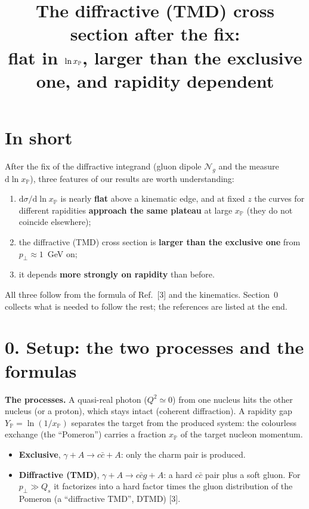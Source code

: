 \documentclass[12pt]{article}
\title{The diffractive (TMD) cross section after the fix:\\
flat in $\ln\xpo$, larger than the exclusive one, and rapidity dependent}
\author{}
\date{}
\newcommand{\xpo}{x_{\mathbb{P}}}
\begin{document}
\maketitle

\section*{In short}

After the fix of the diffractive integrand (gluon dipole $\mathcal{N}_g$ and the measure
$\mathrm{d}\ln\xpo$), three features of our results are worth understanding:
\begin{enumerate}
\item $\mathrm{d}\sigma/\mathrm{d}\ln\xpo$ is nearly \textbf{flat} above a kinematic edge, and at fixed
  $z$ the curves for different rapidities \textbf{approach the same plateau} at large $\xpo$ (they do
  not coincide elsewhere);
\item the diffractive (TMD) cross section is \textbf{larger than the exclusive one} from
  $p_\perp\approx1$~GeV on;
\item it depends \textbf{more strongly on rapidity} than before.
\end{enumerate}
All three follow from the formula of Ref.~[3] and the kinematics. Section~0 collects what is needed
to follow the rest; the references are listed at the end.

\section*{0. Setup: the two processes and the formulas}

\textbf{The processes.} A quasi-real photon ($Q^2\simeq0$) from one nucleus hits the other nucleus
(or a proton), which stays intact (coherent diffraction). A rapidity gap
$Y_{\mathbb{P}}=\ln(1/\xpo)$ separates the target from the produced system: the colourless exchange
(the ``Pomeron'') carries a fraction $\xpo$ of the target nucleon momentum.
\begin{itemize}
\item \textbf{Exclusive}, $\gamma+A\to c\bar c+A$: only the charm pair is produced.
\item \textbf{Diffractive (TMD)}, $\gamma+A\to c\bar c g+A$: a hard $c\bar c$ pair plus a soft gluon.
  For $p_\perp\gg Q_s$ it factorizes into a hard factor times the gluon distribution of the Pomeron
  (a ``diffractive TMD'', DTMD) [3].
\end{itemize}
\end{document}
